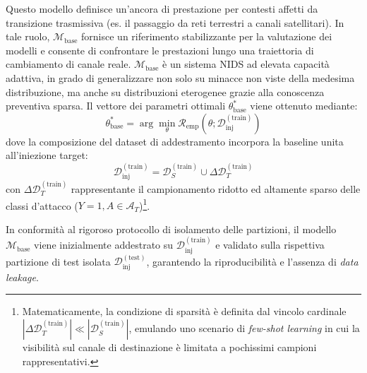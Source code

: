 Questo modello definisce un'ancora di prestazione per contesti affetti da transizione trasmissiva (es. il passaggio da reti terrestri a canali satellitari). In tale ruolo, $\mathcal{M}_{\text{base}}$ fornisce un riferimento stabilizzante per la valutazione dei modelli e consente di confrontare le prestazioni lungo una traiettoria di cambiamento di canale reale. $\mathcal{M}_{\text{base}}$ è un sistema NIDS ad elevata capacità adattiva, in grado di generalizzare non solo su minacce non viste della medesima distribuzione, ma anche su distribuzioni eterogenee grazie alla conoscenza preventiva sparsa. Il vettore dei parametri ottimali $\theta_{\text{base}}^*$ viene ottenuto mediante:
\begin{equation}
    \theta_{\text{base}}^* = \arg\min_\theta \mathcal{R}_{\text{emp}}\left(\theta; \mathcal{D}_{\text{inj}}^{(\text{train})}\right)
    \label{eq:mbase_optimization}
\end{equation}
dove la composizione del dataset di addestramento incorpora la baseline unita all'iniezione target:
\begin{equation}
    \mathcal{D}_{\text{inj}}^{(\text{train})} = \mathcal{D}_{S}^{(\text{train})} \cup \Delta \mathcal{D}_{T}^{(\text{train})}
    \label{eq:dinj_composition}
\end{equation}
con $\Delta \mathcal{D}_{T}^{(\text{train})}$ rappresentante il campionamento ridotto ed altamente sparso delle classi d'attacco ($Y=1, A \in \mathcal{A}_T$)\footnote{Matematicamente, la condizione di sparsità è definita dal vincolo cardinale $|\Delta \mathcal{D}_{T}^{(\text{train})}| \ll |\mathcal{D}_{S}^{(\text{train})}|$, emulando uno scenario di \textit{few-shot learning} in cui la visibilità sul canale di destinazione è limitata a pochissimi campioni rappresentativi.}.

In conformità al rigoroso protocollo di isolamento delle partizioni, il modello $\mathcal{M}_{\text{base}}$ viene inizialmente addestrato su $\mathcal{D}_{\text{inj}}^{(\text{train})}$ e validato sulla rispettiva partizione di test isolata $\mathcal{D}_{\text{inj}}^{(\text{test})}$, garantendo la riproducibilità e l'assenza di \textit{data leakage}.

